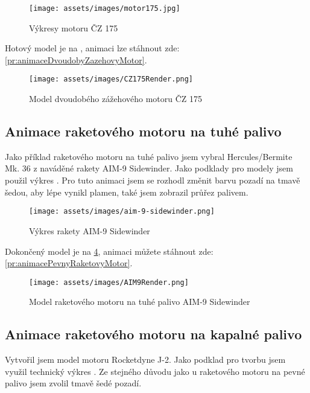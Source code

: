 \begin{figure}[H]
    \centering
    \texttt{[image: assets/images/motor175.jpg]}
    \caption{Výkresy motoru ČZ 175}
    \label{obr:CZ175Vykres}
\end{figure}

{Hotový model je na , animaci lze stáhnout zde: \ref{pr:animaceDvoudobyZazehovyMotor}.}

\begin{figure}[H]
    \centering
    \texttt{[image: assets/images/CZ175Render.png]}
    \caption{Model dvoudobého zážehového motoru ČZ 175 \jaObr}
    \label{obr:CZ175Render}
\end{figure}

\newpage

\subsection{Animace raketového motoru na tuhé palivo}
{Jako příklad raketového motoru na tuhé palivo jsem vybral Hercules/Bermite Mk. 36 z naváděné rakety AIM-9 Sidewinder. Jako podklady pro modely jsem použil výkres . Pro tuto animaci jsem se rozhodl změnit barvu pozadí na tmavě šedou, aby lépe vynikl plamen, také jsem zobrazil průřez palivem.}
\cite{TB:AIM9Sidewinder}

\begin{figure}[H]
    \centering
    \texttt{[image: assets/images/aim-9-sidewinder.png]}
    \caption{Výkres rakety AIM-9 Sidewinder}
    \label{obr:AIM9vykres}
\end{figure}

{Dokončený model je na \ref{obr:AIM9Render}, animaci můžete stáhnout zde: \ref{pr:animacePevnyRaketovyMotor}.}

\begin{figure}[H]
    \centering
    \texttt{[image: assets/images/AIM9Render.png]}
    \caption{Model raketového motoru na tuhé palivo AIM-9 Sidewinder \jaObr}
    \label{obr:AIM9Render}
\end{figure}

\newpage

\subsection{Animace raketového motoru na kapalné palivo}
{Vytvořil jsem model motoru Rocketdyne J-2. Jako podklad pro tvorbu jsem využil technický výkres . Ze stejného důvodu jako u raketového motoru na pevné palivo jsem zvolil tmavě šedé pozadí.}
\cite{HR:F1RocketEngine}

